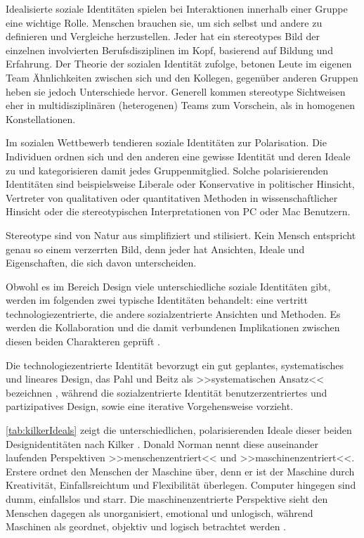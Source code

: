 \medskip Idealisierte soziale Identitäten spielen bei Interaktionen innerhalb einer Gruppe eine wichtige Rolle. Menschen brauchen sie, um sich selbst und andere zu definieren und Vergleiche herzustellen. Jeder hat ein stereotypes Bild der einzelnen involvierten Berufsdisziplinen im Kopf, basierend auf Bildung und Erfahrung. Der Theorie der sozialen Identität zufolge, betonen Leute im eigenen Team Ähnlichkeiten zwischen sich und den Kollegen, gegenüber anderen Gruppen heben sie jedoch Unterschiede hervor. Generell kommen stereotype Sichtweisen eher in multidisziplinären (heterogenen) Teams zum Vorschein, als in homogenen Konstellationen.

\medskip Im sozialen Wettbewerb tendieren soziale Identitäten zur Polarisation. Die Individuen ordnen sich und den anderen eine gewisse Identität und deren Ideale zu und kategorisieren damit jedes Gruppenmitglied. Solche polarisierenden Identitäten sind beispielsweise Liberale oder Konservative in politischer Hinsicht, Vertreter von qualitativen oder quantitativen Methoden in wissenschaftlicher Hinsicht oder die stereotypischen Interpretationen von PC oder Mac Benutzern.

Stereotype sind von Natur aus simplifiziert und stilisiert. Kein Mensch entspricht genau so einem verzerrten Bild, denn jeder hat Ansichten, Ideale und Eigenschaften, die sich davon unterscheiden. 

\medskip Obwohl es im Bereich Design viele unterschiedliche soziale Identitäten gibt, werden im folgenden zwei typische Identitäten behandelt: eine vertritt technologiezentrierte, die andere sozialzentrierte Ansichten und Methoden. Es werden die Kollaboration und die damit verbundenen Implikationen zwischen diesen beiden Charakteren geprüft \citep{Kilker:1999}.

Die technologiezentrierte Identität bevorzugt ein gut geplantes, systematisches und lineares Design, das Pahl und Beitz als >>systematischen Ansatz<< bezeichnen \citep{Pahl:1988}, während die sozialzentrierte Identität benutzerzentriertes und partizipatives Design, sowie eine iterative Vorgehensweise vorzieht.

\autoref{tab:kilkerIdeals} zeigt die unterschiedlichen, polarisierenden Ideale dieser beiden Designidentitäten nach Kilker \citep{Kilker:1999}. Donald Norman nennt diese auseinander laufenden Perspektiven >>menschenzentriert<< und >>maschinenzentriert<<. Erstere ordnet den Menschen der Maschine über, denn er ist der Maschine durch Kreativität, Einfallsreichtum und Flexibilität überlegen. Computer hingegen sind dumm, einfallslos und starr. Die maschinenzentrierte Perspektive sieht den Menschen dagegen als unorganisiert, emotional und unlogisch, während Maschinen als geordnet, objektiv und logisch betrachtet werden \citep{Norman:1994}. 

